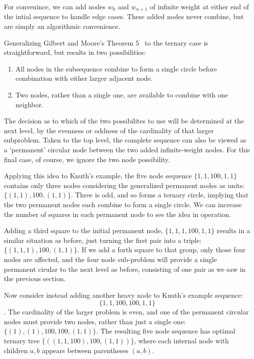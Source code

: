 \documentclass[12pt]{article}
\begin{document}
For convenince, we can add nodes $w_0$ and $w_{n+1}$ of infinite weight
at either end of the intial sequence to handle edge cases. These added nodes
never combine, but are simply an algorithmic convenience.

Generalizing Gilbert and Moore's Theorem 5~\cite{gilbert59} to the ternary
case is straightforward, but results in two possibilities:

\begin{enumerate}\vspace{-1 mm}
	\item All nodes in the subsequence combine to form a single circle before
	 combination with either larger adjacent node.
	\item Two nodes, rather than a single one, are available to combine with one neighbor.
\end{enumerate}

The decision as to which of the two possibilites to use will be determined at the next
level, by the evenness or oddness of the cardinality of that larger subproblem. 
Taken to the top level, the complete sequence can also be viewed as a `permanent' 
circular node between the two added infinite-weight nodes. For this final case, 
of course, we ignore the two node possibility.

Applying this idea to Knuth's example, the five node sequence $\{1, 1, 100, 1, 1\}$
contains only three nodes considering the generalized permanent nodes as units:
$\{(1, 1), 100, (1, 1)\}$.  Three is odd, and so forms a ternary circle, implying that the
two permanent nodes each combine to form a single circle. We can increase the
number of squares in each permanent node to see the idea in operation.

Adding a third square to the initial permanent node, $\{1, 1, 1, 100, 1, 1\}$ 
results in a similar situation as before, just turning the first pair into a triple:
$\{(1, 1, 1), 100, (1, 1)\}$. If we add a forth square to that group, only those
four nodes are affected, and the four node sub-problem will provide a single
permanent cirular to the next level as before, consisting of one pair as we saw
in the previous section.

Now consider instead adding another heavy node to Knuth's example sequence:
$$\{1, 1, 100, 100, 1, 1\}$$. The cardinality of the larger problem is even, and
one of the permanent circular nodes must provide two nodes, rather than just a
single one:  $\{(1), (1), 100, 100, (1, 1)\}$.  The resulting five node sequence
has optimal ternary tree $\{((1, 1, 100), 100, (1, 1))\}$, where each internal node
with children $a, b$ appears between parentheses $(a, b)$.
\end{document}
